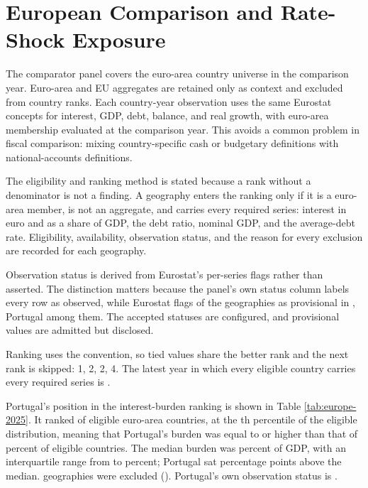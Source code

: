 \documentclass[11pt,a4paper]{article}
\begin{document}


\section{European Comparison and Rate-Shock Exposure}
\label{sec:comparison}

The comparator panel covers the euro-area country universe in the comparison
year. Euro-area and EU aggregates are retained only as context and excluded
from country ranks. Each country-year observation uses the same Eurostat
concepts for interest, GDP, debt, balance, and real growth, with euro-area
membership evaluated at the comparison year. This avoids a common problem in
fiscal comparison: mixing country-specific cash or budgetary definitions with
national-accounts definitions.

The eligibility and ranking method is stated because a rank without a denominator
is not a finding. A geography enters the ranking only if it is a
euro-area member, is not an aggregate, and carries every required series:
interest in euro and as a share of GDP, the debt ratio, nominal GDP, and the
average-debt rate. Eligibility, availability, observation status, and the
reason for every exclusion are recorded for each geography.

Observation status is derived from Eurostat's per-series flags rather than
asserted. The distinction matters because the panel's own status column labels
every row as observed, while Eurostat flags \ProvisionalComparatorCount{} of the
geographies as provisional in \ComparisonYear{}, Portugal among them. The
accepted statuses are configured, and provisional values are admitted but
disclosed.

Ranking uses the \ComparisonRankingMethod{} convention, so tied values share
the better rank and the next rank is skipped: 1, 2, 2, 4. The latest year in
which every eligible country carries every required series is
\LatestCommonYear{}.

Portugal's \ComparisonYear{} position in the interest-burden ranking is shown
in Table \ref{tab:europe-2025}. It ranked \PortugalComparisonRank{} of
\EligibleComparatorCount{}
eligible euro-area countries, at the \PortugalComparisonPercentile{}th
percentile of the eligible distribution, meaning that Portugal's burden was
equal to or higher than that of \PortugalComparisonPercentile{} percent of
eligible countries. The median burden was
\ComparatorMedianPctGdp{} percent of GDP, with an interquartile range from
\ComparatorFirstQuartilePctGdp{} to \ComparatorThirdQuartilePctGdp{} percent;
Portugal sat \PortugalMinusMedianPp{} percentage points above the median.
\ExcludedComparatorCount{} geographies were excluded
(\ComparisonExclusionReasons{}). Portugal's own \ComparisonYear{} observation
status is \PortugalComparisonStatus{}.
\end{document}
